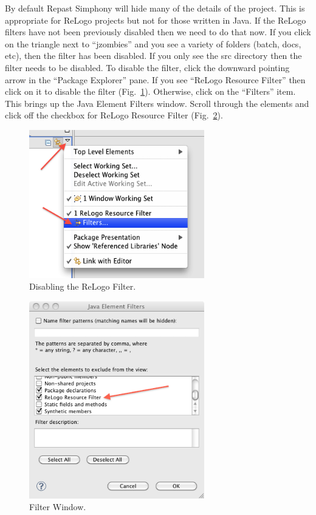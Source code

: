 \documentclass[11pt]{amsart}
\begin{document}
 By default Repast Simphony will hide many of the details of the project. This is appropriate for ReLogo projects but not for those written in Java. If the ReLogo filters have not been previously disabled then we need to do that now. If you click on the triangle next to ``jzombies'' and you see a variety of folders (batch, docs, etc), then the filter has been disabled. If you only see the src directory then the filter needs to be disabled. To disable the filter, click the downward pointing arrow in the ``Package Explorer'' pane. If you see ``ReLogo Resource Filter''  then click on it to disable the filter (Fig.~\ref{fig:filter}).  Otherwise, click on the ``Filters'' item. This brings up the Java Element Filters window. Scroll through the elements and click off the checkbox for ReLogo Resource Filter (Fig.~\ref{fig:filter2}). 


\begin{figure}[h]
\begin{center}
\vspace{.2in}
\centerline {
\includegraphics[width=3in]{GettingStartedImages/filter.png}
}
\caption{Disabling the ReLogo Filter.}
\label{fig:filter}
\end{center}
\end{figure}


\begin{figure}[h]
\begin{center}
\vspace{.2in}
\centerline {
\includegraphics[width=3in]{GettingStartedImages/filter_window.png}
}
\caption{Filter Window.}
\label{fig:filter2}
\end{center}
\end{figure}
\end{document}
